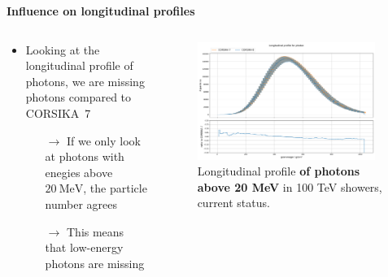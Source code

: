 \documentclass[aspectratio=1610, 9pt]{beamer}
\begin{document}
\begin{frame}
  \textbf{Influence on longitudinal profiles}
  \vspace{5mm}
    \begin{columns}[onlytextwidth]
        \begin{column}{0.4\textwidth}
            \begin{itemize}
              \item Looking at the longitudinal profile of photons, we are missing photons compared to CORSIKA~7
              \begin{itemize}
                \item[$\rightarrow$] If we only look at photons with enegies above $\SI{20}{\mega\electronvolt}$, the particle number agrees
                \item[$\rightarrow$] This means that low-energy photons are missing
              \end{itemize}
            \end{itemize}
        \end{column}
        \begin{column}{0.6\textwidth}
            \begin{figure}
                \centering
                \includegraphics[width=0.95\textwidth]{plots/long_photon_2023_cherenkov.png}
                \caption{Longitudinal profile \textbf{of photons above 20 MeV} in 100 \si{\tera\electronvolt} showers, current status.}
            \end{figure}
        \end{column}
    \end{columns}
\end{frame}
\end{document}
